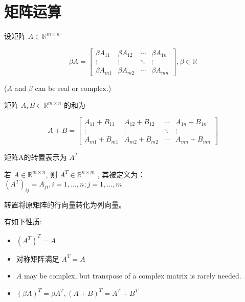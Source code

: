 \section{矩阵运算}

\begin{definition}[矩阵数乘]
    设矩阵 $ A \in \mathbb{R}^{m \times n} $

    \begin{equation} \beta A=\left[\begin{array}{cccc}\beta A_{11} & \beta A_{12} & \cdots & \beta A_{1 n} \\ \vdots & \vdots & \ddots & \vdots \\ \beta A_{m 1} & \beta A_{m 2} & \cdots & \beta A_{m n}\end{array}\right], \beta \in \mathbb{R} \end{equation}

    ($ A $ and $ \beta $ can be real or complex.)
\end{definition}

\begin{definition}[矩阵加法]
    矩阵 $ A, B \in \mathbb{R}^{m \times n} $ 的和为

    \begin{equation} A+B=\left[\begin{array}{cccc}A_{11}+B_{11} & A_{12}+B_{12} & \cdots & A_{1 n}+B_{1 n} \\ \vdots & \vdots & \ddots & \vdots \\ A_{m 1}+B_{m 1} & A_{m 2}+B_{m 2} & \cdots & A_{m n}+B_{m n}\end{array}\right] \end{equation}
\end{definition}

\begin{definition}[Transpose]
    矩阵A的转置表示为 $ A^{T} $
    
    若 $A\in \mathbb{R}^{m \times n} $, 则 $ A^{T} \in \mathbb{R}^{n \times m} $ , 其被定义为： $ \left(A^{T}\right)_{i j}=A_{j i}, i=1, \ldots, n ; j=1, \ldots, m $
\end{definition}

转置将原矩阵的行向量转化为列向量。

\begin{corollary}
    [转置的性质]
    有如下性质:
    \begin{itemize}
        \item $ \left(A^{T}\right)^{T}=A $
        \item 对称矩阵满足 $ A^{T}=A $
        \item  $A$ may be complex, but transpose of a complex matrix is rarely needed.
        \item $ (\beta A)^{T}=\beta A^{T},(A+B)^{T}=A^{T}+B^{T} $
    \end{itemize}
\end{corollary}

